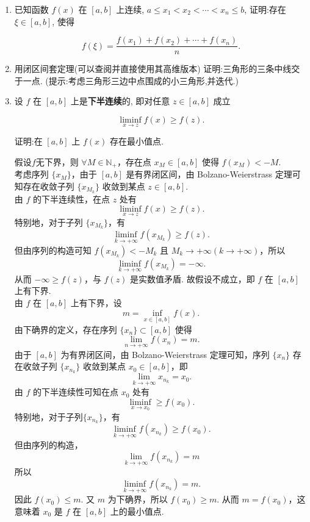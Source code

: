 \begin{enumerate}
    \[\displaystyle \lim_{x\to -\infty}f(x) = A,\quad \lim_{x\to +\infty}f(x) = B.\]

    证明: $f$ 在 $(-\infty , +\infty)$ 上一致连续.
    \item[9.]已知函数 $f(x)$ 在 $[a, b]$ 上连续, $\displaystyle a \leq x_1 < x_2 < \cdots < x_n \leq b$, 证明:存在 $\xi \in [a, b]$, 使得

    \[\displaystyle f(\xi) = \frac{f(x_1) + f(x_2) + \cdots + f(x_n)}{n}.\]

    \item[10.]用闭区间套定理(可以查阅并直接使用其高维版本) 证明:三角形的三条中线交于一点. (提示:考虑三角形三边中点围成的小三角形,并迭代.)
    \item[11.]设 $f$ 在 $[a, b]$ 上是\textbf{下半连续}的, 即对任意 $z \in [a, b]$ 成立

    \[\displaystyle\liminf_{x\to z} f(x)\geq f(z).\]

    证明:在 $[a, b]$ 上 $f(x)$ 存在最小值点.
    \begin{solution}
        假设$f$无下界，则 $\forall M\in\mathbb{N}_{+}$，存在点 $x_{M}\in[a,b]$ 使得 $f(x_{M})<-M$.\\
        考虑序列 $\{x_{M}\}$，由于 $[a,b]$ 是有界闭区间，由 Bolzano-Weierstrass 定理可知存在收敛子列 $\{x_{M_{k}}\}$ 收敛到某点 $z\in[a,b]$.\\
        由 $f$ 的下半连续性，在点 $z$ 处有
        \[
        \liminf_{x\to z}f(x)\geq f(z).
        \]
        特别地，对于子列 $\{x_{M_{k}}\}$，有
        \[
        \liminf_{k\to +\infty}f(x_{M_{k}})\geq f(z).
        \]
        但由序列的构造可知 $f(x_{M_{k}})<-M_{k}$ 且 $M_{k}\to +\infty(k\to+\infty)$，所以
        \[
        \liminf_{k\to+\infty}f(x_{M_{k}})=-\infty.
        \]
        从而 $-\infty\geq f(z)$，与 $f(z)$ 是实数值矛盾. 故假设不成立，即 $f$ 在 $[a,b]$ 上有下界.\\
        由 $f$ 在 $[a,b]$ 上有下界，设
        \[
        m=\inf_{x\in[a,b]}f(x).
        \]
        由下确界的定义，存在序列 $\{x_{n}\}\subset[a,b]$ 使得
        \[
        \lim_{n\to+\infty}f(x_{n})=m.
        \]
        由于 $[a,b]$ 为有界闭区间，由 Bolzano-Weierstrass 定理可知，序列 $\{x_{n}\}$ 存在收敛子列 $\{x_{n_{k}}\}$ 收敛到某点 $x_{0}\in[a,b]$，即
        \[
        \lim_{k\to +\infty}x_{n_{k}}=x_{0}.
        \]
        由 $f$ 的下半连续性可知在点 $x_{0}$ 处有
        \[
        \liminf_{x\to x_{0}}\geq f(x_{0}).
        \]
        特别地，对于子列$\{x_{n_{k}}\}$，有
        \[
        \liminf_{k\to +\infty}f(x_{n_{k}})\geq f(x_{0}).
        \]
        但由序列的构造，
        \[
        \lim_{k\to +\infty}f(x_{n_{k}})=m
        \]
        所以
        \[
        \liminf_{k\to +\infty}f(x_{n_{k}})=m.
        \]
        因此 $f(x_{0})\leq m$.
        又 $m$ 为下确界，所以 $f(x_{0})\geq m$.
        从而 $m=f(x_{0})$，这意味着 $x_{0}$ 是 $f$ 在 $[a,b]$ 上的最小值点.
    \end{solution}
\end{enumerate}

